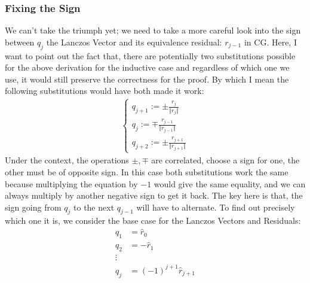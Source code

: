 \documentclass[]{article}
\theoremstyle{definition}
\begin{document}
\begin{appendices}
        \subsubsection{Fixing the Sign}
            We can't take the triumph yet; we need to take a more careful look into the sign between $q_j$ the Lanczos Vector and its equivalence residual: $r_{j - 1}$ in CG. Here, I want to point out the fact that, there are potentially two substitutions possible for the above derivation for the inductive case and regardless of which one we use, it would still preserve the correctness for the proof. By which I mean the following substitutions would have both made it work: 
            \begin{align}
                \begin{cases}
                    q_{j + 1} := \pm \frac{r_j}{\Vert r_j\Vert}
                    \\
                    q_{j} := \mp \frac{r_{j - 1}}{\Vert r_{j - 1}\Vert}
                    \\
                    q_{j + 2} := \pm \frac{r_{j + 1}}{\Vert r_{j + 1}\Vert}
                \end{cases}
            \end{align}
            Under the context, the operations $\pm, \mp$ are correlated, choose a sign for one, the other must be of opposite sign. In this case both substitutions work the same because multiplying the equation by $-1$ would give the same equality, and we can always multiply by another negative sign to get it back. The key here is that, the sign going from $q_{j}$ to the next $q_{j - 1}$ will have to alternate. To find out precisely which one it is, we consider the base case for the Lanczos Vectors and Residuals: 
            \begin{align}
                q_1 &= \hat r_0\\
                q_2 &= -\hat r_1
                \\
                \vdots
                \\
                q_j &= (-1)^{j + 1}\hat r_{j + 1}
            \end{align}

\end{appendices}
\end{document}
